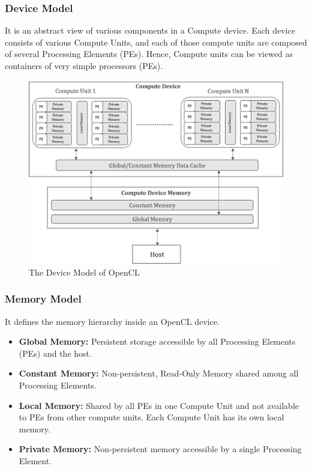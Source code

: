 \subsubsection{Device Model}
\label{2_3_1_1}
It is an abstract view of various components in a Compute device. 
Each device consists of various Compute Units, and each of those compute units are composed of several Processing Elements (PEs). 
Hence, Compute units can be viewed as containers of very simple processors (PEs). 

\begin{figure}[h!]
  \centering
  \includegraphics[width=0.80\linewidth]{figures/openCL_deviceModel.png}
  \caption{The Device Model of OpenCL
  \cite{opencl_ajg}}
  \label{fig:openCL_deviceModel}
\end{figure}

\subsubsection{Memory Model}
\label{2_3_1_2}
It defines the memory hierarchy inside an OpenCL device. 
\begin{itemize}
\item \textbf{Global Memory:} Persistent storage accessible by all Processing Elements (PEs) and the host.
\item \textbf{Constant Memory:} Non-persistent, Read-Only Memory shared among all Processing Elements.
\item \textbf{Local Memory:} Shared by all PEs in one Compute Unit and not available to PEs from other compute units. Each Compute Unit has its own local memory.
\item \textbf{Private Memory:} Non-persistent memory accessible by a single Processing Element.
\end{itemize}

